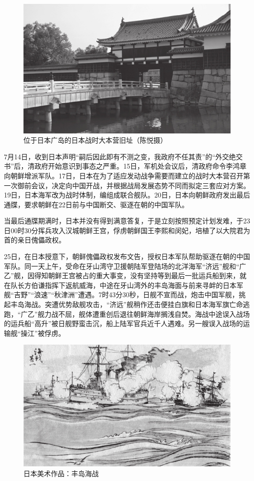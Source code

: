 \documentclass[12pt,UTF8]{ctexbook}
\begin{document}
\begin{figure}[htbp]
	\centering
	\includegraphics[width=0.7\linewidth]{8}
	\caption{位于日本广岛的日本战时大本营旧址（陈悦摄）}
	\label{fig:1}
\end{figure}

7月14日，收到日本声明“嗣后因此即有不测之变，我政府不任其责”的“外交绝交书”后，清政府开始意识到事态之严重。15日，军机处会议后，清政府命令李鸿章向朝鲜增派军队。17日，日本在为了适应发动战争需要而建立的战时大本营召开第一次御前会议，决定向中国开战，并根据战局发展态势不同而拟定三套应对方案。19日，日本海军改为战时体制，编组成联合舰队。20日，日本向朝鲜政府发出最后通牒，要求朝鲜在22日前与中国断交、驱逐在朝的中国军队。

当最后通牒期满时，日本并没有得到满意答复，于是立刻按照预定计划发难，于23日00时30分挥兵攻入汉城朝鲜王宫，俘虏朝鲜国王李熙和闵妃，培植了以大院君为首的亲日傀儡政权。

25日，在日本授意下，朝鲜傀儡政权发布文告，授权日本军队帮助驱逐在朝的中国军队。同一天上午，受命在牙山湾守卫援朝陆军登陆场的北洋海军“济远”舰和“广乙”舰，因得知朝鲜王宫被占的重大事变，没有坚持等到最后一批运兵船到来，就在队长方伯谦指挥下返航威海，中途在牙山湾外的丰岛海面与前来寻衅的日本军舰“吉野”“浪速”“秋津洲”遭遇。7时43分30秒，日舰不宣而战，炮击中国军舰，挑起丰岛海战。突遭优势敌舰攻击，“济远”舰稍作还击便挂白旗和日本海军旗亡命逃跑，“广乙”舰力战不屈，舰体遭重创后退往朝鲜海岸搁浅自焚。海战中途误入战场的运兵船“高升”被日舰野蛮击沉，船上陆军官兵近千人遇难。另一艘误入战场的运输舰“操江”被俘虏。

\begin{figure}[htbp]
	\centering
	\includegraphics[width=0.7\linewidth]{9}
	\caption{日本美术作品：丰岛海战}
	\label{fig:1}
\end{figure}
\end{document}
